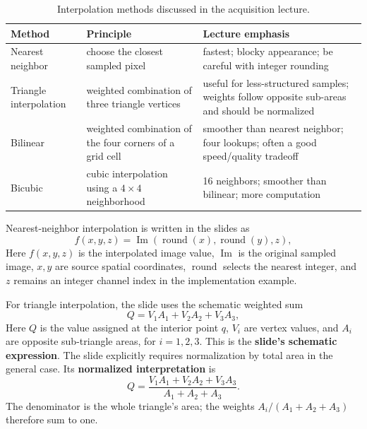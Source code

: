 \documentclass[11pt,a4paper,oneside]{report}
\begin{document}
\begin{table}[htbp]
\centering
\caption{Interpolation methods discussed in the acquisition lecture.}
\label{tab:interpolation-methods}
\begin{tabularx}{\textwidth}{@{}l Y Y@{}}
\toprule
{}
\textbf{Method} & \textbf{Principle} & \textbf{Lecture emphasis} \\
\midrule
Nearest neighbor & choose the closest sampled pixel & fastest; blocky appearance; be careful with integer rounding \\
Triangle interpolation & weighted combination of three triangle vertices & useful for less-structured samples; weights follow opposite sub-areas and should be normalized \\
Bilinear & weighted combination of the four corners of a grid cell & smoother than nearest neighbor; four lookups; often a good speed/quality tradeoff \\
Bicubic & cubic interpolation using a $4\times4$ neighborhood & 16 neighbors; smoother than bilinear; more computation \\
\bottomrule
\end{tabularx}
\end{table}

Nearest-neighbor interpolation is written in the slides as
\begin{equation}
  f(x,y,z)=\operatorname{Im}(\operatorname{round}(x),\operatorname{round}(y),z),
  \label{eq:nearest-neighbor}
\end{equation}
Here $f(x,y,z)$ is the interpolated image value, $\operatorname{Im}$ is the original sampled image, $x,y$ are source spatial coordinates, $\operatorname{round}$ selects the nearest integer, and $z$ remains an integer channel index in the implementation example.

For triangle interpolation, the slide uses the schematic weighted sum
\begin{equation}
  Q=V_1A_1+V_2A_2+V_3A_3,
  \label{eq:triangle-interp}
\end{equation}
Here $Q$ is the value assigned at the interior point $q$, $V_i$ are vertex values, and $A_i$ are opposite sub-triangle areas, for $i=1,2,3$. This is the \textbf{slide's schematic expression}. The slide explicitly requires normalization by total area in the general case. Its \textbf{normalized interpretation} is
\begin{equation}
 Q=\frac{V_1A_1+V_2A_2+V_3A_3}{A_1+A_2+A_3}.
 \label{eq:triangle-normalized}
\end{equation}
The denominator is the whole triangle's area; the weights $A_i/(A_1+A_2+A_3)$ therefore sum to one.
\end{document}
